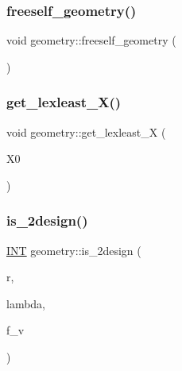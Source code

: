 \mbox{\label{classgeometry_a504b1b52d24b4ae00d9fd0b7838b57e6}} 
\subsubsection{\texorpdfstring{freeself\+\_\+geometry()}{freeself\_geometry()}}
{\footnotesize\ttfamily void geometry\+::freeself\+\_\+geometry (\begin{DoxyParamCaption}{ }\end{DoxyParamCaption})}

\mbox{\label{classgeometry_a0fe3595dfda0489759f397fecf455c17}} 
\subsubsection{\texorpdfstring{get\+\_\+lexleast\+\_\+\+X()}{get\_lexleast\_X()}}
{\footnotesize\ttfamily void geometry\+::get\+\_\+lexleast\+\_\+X (\begin{DoxyParamCaption}\item[{\mbox{\hyperlink{classmatrix}{matrix}} \&}]{X0 }\end{DoxyParamCaption})}

\mbox{\label{classgeometry_a31e12da96f9d6f9fd62330bdbc59236d}} 
\subsubsection{\texorpdfstring{is\+\_\+2design()}{is\_2design()}}
{\footnotesize\ttfamily \mbox{\hyperlink{galois_8h_a09fddde158a3a20bd2dcadb609de11dc}{I\+NT}} geometry\+::is\+\_\+2design (\begin{DoxyParamCaption}\item[{\mbox{\hyperlink{galois_8h_a09fddde158a3a20bd2dcadb609de11dc}{I\+NT}} \&}]{r,  }\item[{\mbox{\hyperlink{galois_8h_a09fddde158a3a20bd2dcadb609de11dc}{I\+NT}} \&}]{lambda,  }\item[{\mbox{\hyperlink{galois_8h_a09fddde158a3a20bd2dcadb609de11dc}{I\+NT}}}]{f\+\_\+v }\end{DoxyParamCaption})}

